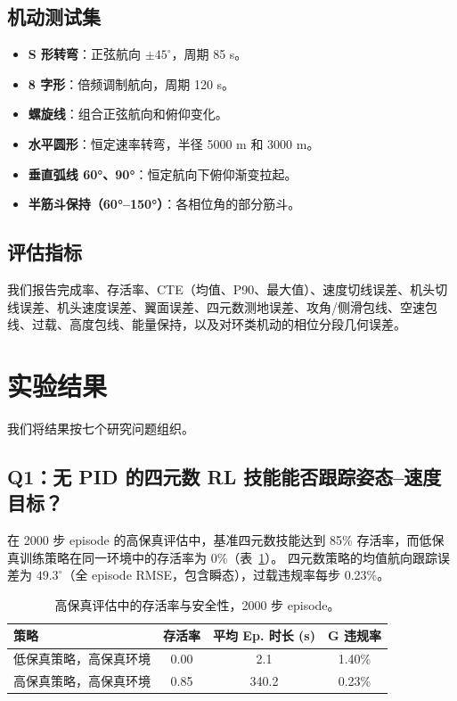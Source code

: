 \documentclass{article}
\begin{document}
\subsection{机动测试集}

\begin{itemize}
  \item \textbf{S 形转弯}：正弦航向 $\pm45^\circ$，周期 85 s。
  \item \textbf{8 字形}：倍频调制航向，周期 120 s。
  \item \textbf{螺旋线}：组合正弦航向和俯仰变化。
  \item \textbf{水平圆形}：恒定速率转弯，半径 5000 m 和 3000 m。
  \item \textbf{垂直弧线 60°、90°}：恒定航向下俯仰渐变拉起。
  \item \textbf{半筋斗保持（60°--150°）}：各相位角的部分筋斗。
\end{itemize}

\subsection{评估指标}

我们报告完成率、存活率、CTE（均值、P90、最大值）、速度切线误差、机头切线误差、机头速度误差、翼面误差、四元数测地误差、攻角/侧滑包线、空速包线、过载、高度包线、能量保持，以及对环类机动的相位分段几何误差。


\section{实验结果}

我们将结果按七个研究问题组织。

\subsection{Q1：无 PID 的四元数 RL 技能能否跟踪姿态--速度目标？}

在 2000 步 episode 的高保真评估中，基准四元数技能达到 85\% 存活率，而低保真训练策略在同一环境中的存活率为 0\%（表~\ref{tab:survival}）。
四元数策略的均值航向跟踪误差为 $49.3^\circ$（全 episode RMSE，包含瞬态），过载违规率每步 0.23\%。

\begin{table}[t]
\caption{高保真评估中的存活率与安全性，2000 步 episode。}
\label{tab:survival}
\centering
\begin{tabular}{lccc}
  \hline
  \textbf{策略} & \textbf{存活率} & \textbf{平均 Ep. 时长 (s)} & \textbf{G 违规率} \\
  \hline
  低保真策略，高保真环境  & 0.00  & 2.1   & 1.40\% \\
  高保真策略，高保真环境   & 0.85  & 340.2 & 0.23\% \\
  \hline
\end{tabular}
\end{table}
\end{document}
